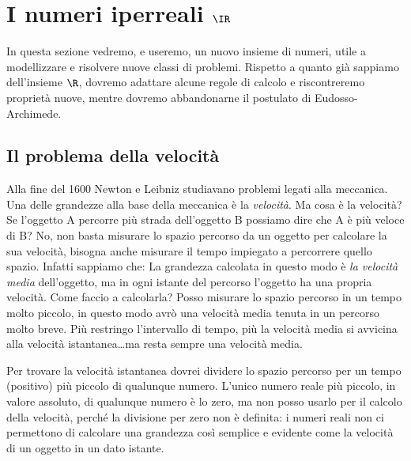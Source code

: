 
\section{I numeri iperreali $\IR$}
\label{sec:insnum_iperreali}

In questa sezione vedremo, e useremo, un nuovo insieme di numeri, utile a 
modellizzare e risolvere nuove classi di problemi. 
Rispetto a quanto già sappiamo dell'insieme \(\R\), dovremo adattare alcune 
regole di calcolo e riscontreremo proprietà nuove, mentre dovremo 
abbandonarne il postulato di Eudosso-Archimede. 

\subsection{Il problema della velocità}
\label{subsec:insnum_velocita}

Alla fine del 1600 Newton e Leibniz studiavano problemi legati alla 
meccanica. 
Una delle grandezze alla base della meccanica è la \emph{velocità}. 
Ma cosa è la velocità? 
Se l'oggetto A percorre più strada dell'oggetto B possiamo dire 
che A è più veloce di B? No, non basta misurare lo spazio percorso da un 
oggetto per calcolare la sua velocità, bisogna anche misurare il tempo 
impiegato a percorrere quello spazio. Infatti sappiamo che:
La grandezza calcolata in questo modo è \emph{la velocità media} 
dell'oggetto, ma in ogni istante del percorso l'oggetto ha una propria 
velocità. 
Come faccio a calcolarla? Posso misurare lo spazio percorso in un tempo 
molto piccolo, in questo modo avrò una velocità media tenuta in un percorso 
molto breve. 
Più restringo l'intervallo di tempo, più la velocità media si avvicina alla 
velocità istantanea\dots ma resta sempre una velocità media. 

Per trovare la velocità istantanea dovrei dividere lo spazio percorso per 
un tempo (positivo) più piccolo di qualunque numero. L'unico numero reale
più piccolo, in valore assoluto, di qualunque numero è lo zero, ma 
non posso usarlo per il calcolo della velocità, perché la divisione per 
zero non è definita: i numeri reali non ci permettono di calcolare una 
grandezza così semplice e evidente come la velocità di un oggetto in un 
dato istante.

